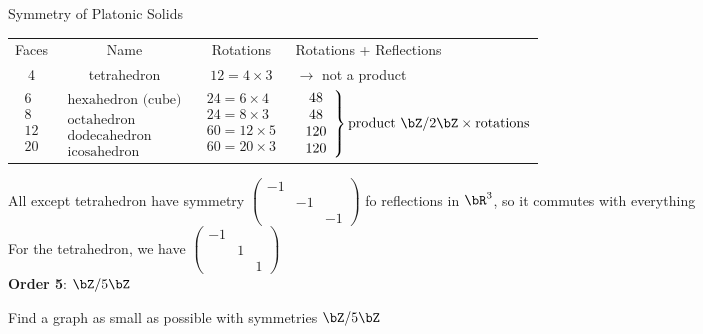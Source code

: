 \noindent
Symmetry of Platonic Solids \\
\begin{tabular}{c c c l}
    Faces & Name & Rotations & Rotations + Reflections  \\
    4 & tetrahedron & $12 = 4 \times 3$ & \quad 24 \quad $\to$ not a product \\
    $\begin{array}{c}
       6 \\ 8 \\ 12 \\ 20
    \end{array}$ & 
    $\begin{array}{c}
       \text{hexahedron (cube)} \\ \text{octahedron} \\ \text{dodecahedron} \\ \text{icosahedron}
    \end{array}$ & 
    $\begin{array}{c}
       24 = 6 \times 4 \\ 24 = 8 \times 3 \\ 60 = 12 \times 5 \\ 60 = 20 \times 3
    \end{array}$ & 
    $\left. \begin{array}{c}
       48 \\ 48 \\ 120 \\ 120
    \end{array} \right\} \text{product } \bZ/2\bZ \times \text{rotations} $
\end{tabular}
All except tetrahedron have symmetry $\begin{pmatrix} -1 & & \\ & -1 & \\ & & -1 \end{pmatrix}$ fo reflections in $\bR^3$, so it commutes with everything \\
For the tetrahedron, we have $\begin{pmatrix} -1 & & \\ & 1 & \\ & & 1 \end{pmatrix}$ \\

\noindent
\textbf{Order 5}: $\bZ/5\bZ$
\begin{exercise}
    Find a graph as small as possible with symmetries $\bZ/5\bZ$ 
\end{exercise}

